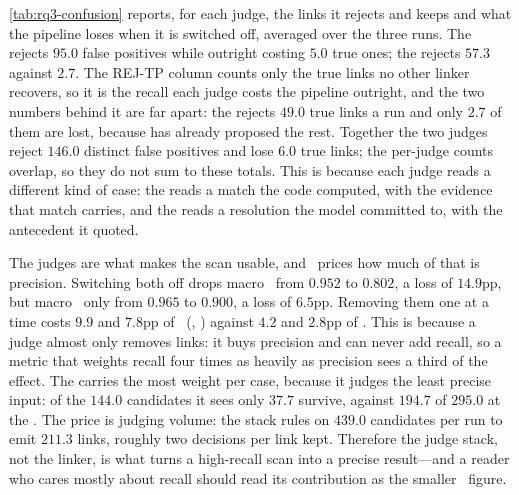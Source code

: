 
\autoref{tab:rq3-confusion} reports, for each judge, the links it rejects and keeps and what the pipeline loses when it is switched off, averaged over the three runs.
The \nameValidator{} rejects $95.0$ false positives while outright costing $5.0$ true ones; the \corefValidator{} rejects $57.3$ against $2.7$.
The REJ-TP column counts only the true links no other linker recovers, so it is the recall each judge costs the pipeline outright, and the two numbers behind it are far apart: the \corefValidator{} rejects $49.0$ true links a run and only $2.7$ of them are lost, because \linkerN{} has already proposed the rest.
Together the two judges reject $146.0$ distinct false positives and lose $6.0$ true links; the per-judge counts overlap, so they do not sum to these totals.
This is because each judge reads a different kind of case: the \nameValidator{} reads a match the code computed, with the evidence that match carries, and the \corefValidator{} reads a resolution the model committed to, with the antecedent it quoted.

The judges are what makes the scan usable, and \ftwo\ prices how much of that is precision.
Switching both off drops macro \fone\ from $0.952$ to $0.802$, a loss of $14.9$pp, but macro \ftwo\ only from $0.965$ to $0.900$, a loss of $6.5$pp.
Removing them one at a time costs $9.9$ and $7.8$pp of \fone\ (\nameValidator{}, \corefValidator{}) against $4.2$ and $2.8$pp of \ftwo.
This is because a judge almost only removes links: it buys precision and can never add recall, so a metric that weights recall four times as heavily as precision sees a third of the effect.
The \corefValidator{} carries the most weight per case, because it judges the least precise input: of the $144.0$ candidates it sees only $37.7$ survive, against $194.7$ of $295.0$ at the \nameValidator{}.
The price is judging volume: the stack rules on $439.0$ candidates per run to emit $211.3$ links, roughly two decisions per link kept.
Therefore the judge stack, not the linker, is what turns a high-recall scan into a precise result---and a reader who cares mostly about recall should read its contribution as the smaller \ftwo\ figure.

